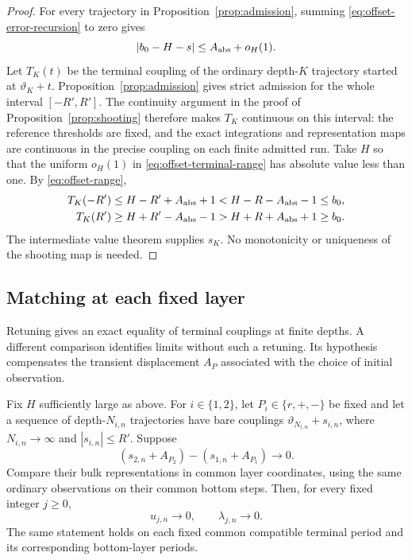 \begin{proof}
For every trajectory in Proposition~\ref{prop:admission}, summing
\eqref{eq:offset-error-recursion} to zero gives
\begin{equation}
 \left|b_0-H-s\right|\le A_{\rm abs}+o_H(1).
 \label{eq:offset-terminal-range}
\end{equation}
Let $T_K(t)$ be the terminal coupling of the ordinary depth-$K$
trajectory started at $\vartheta_K+t$.  Proposition~\ref{prop:admission}
gives strict admission for the whole interval $[-R',R']$.
The continuity argument in the proof of Proposition~\ref{prop:shooting}
therefore makes $T_K$ continuous on this interval: the reference
thresholds are fixed, and the exact integrations and representation
maps are continuous in the precise coupling on each finite admitted
run.  Take $H$ so that the uniform $o_H(1)$ in
\eqref{eq:offset-terminal-range} has absolute value less than one.
By \eqref{eq:offset-range},
\begin{align*}
 T_K(-R')&\le H-R'+A_{\rm abs}+1
                  <H-R-A_{\rm abs}-1\le b_0,\\
 T_K(R')&\ge H+R'-A_{\rm abs}-1
                  >H+R+A_{\rm abs}+1\ge b_0.
\end{align*}
The intermediate value theorem supplies $s_K$.  No monotonicity or
uniqueness of the shooting map is needed.
\end{proof}

\subsection{Matching at each fixed layer}

Retuning gives an exact equality of terminal couplings at finite
depths.  A different comparison identifies limits without such a
retuning.  Its hypothesis compensates the transient displacement
$A_P$ associated with the choice of initial observation.

\begin{proposition}
\label{prop:matching}
Fix $H$ sufficiently large as above.  For $i\in\{1,2\}$, let
$P_i\in\{r,+,-\}$ be fixed and let a sequence of depth-$N_{i,n}$
trajectories have bare couplings
$\vartheta_{N_{i,n}}+s_{i,n}$, where
$N_{i,n}\longrightarrow\infty$ and $|s_{i,n}|\le R'$.
Suppose
\begin{equation}
 (s_{2,n}+A_{P_2})-(s_{1,n}+A_{P_1})\longrightarrow0.
 \label{eq:offset-matching-hypothesis}
\end{equation}
Compare their bulk representations in common layer coordinates,
using the same ordinary observations on their common bottom steps.
Then, for every fixed integer $j\ge0$,
\begin{equation}
 u_{j,n}\longrightarrow0,\qquad
 \lambda_{j,n}\longrightarrow0.
 \label{eq:offset-fixed-layer-matching}
\end{equation}
The same statement holds on each fixed common compatible terminal
period and its corresponding bottom-layer periods.
\end{proposition}

